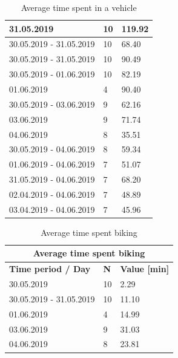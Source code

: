 \begin{table}[]
{\begin{tabular}{|l|l|l|}
			31.05.2019                 & 10         & 119.92                   \\ \hline
			30.05.2019 - 31.05.2019    & 10         & 68.40                    \\ \hline
			30.05.2019 - 31.05.2019    & 10         & 90.49                    \\ \hline
			30.05.2019 - 01.06.2019    & 10         & 82.19                    \\ \hline
			01.06.2019                 & 4          & 90.40                    \\ \hline
			30.05.2019 - 03.06.2019    & 9          & 62.16                    \\ \hline
			03.06.2019                 & 9          & 71.74                    \\ \hline
			04.06.2019                 & 8          & 35.51                    \\ \hline
			30.05.2019 - 04.06.2019    & 8          & 59.34                    \\ \hline
			01.06.2019 - 04.06.2019    & 7          & 51.07                    \\ \hline
			31.05.2019 - 04.06.2019    & 7          & 68.20                    \\ \hline
			02.04.2019 - 04.06.2019    & 7          & 48.89                    \\ \hline
			03.04.2019 - 04.06.2019    & 7          & 45.96                    \\ \hline
		\end{tabular}
		\caption{Average time spent in a vehicle}
		\label{results-vehicle}
	}
\end{table}

\begin{table}[]
	\centering
	\begin{tabular}{|l|l|l|}
		\hline
		\multicolumn{3}{|c|}{\textbf{Average time spent biking}}           \\ \hline
		\textbf{Time period / Day} & \textbf{N} & \textbf{Value {[}min{]}} \\ \hline
		30.05.2019                 & 10         & 2.29                     \\ \hline
		30.05.2019 - 31.05.2019    & 10         & 11.10                    \\ \hline
		01.06.2019                 & 4          & 14.99                    \\ \hline
		03.06.2019                 & 9          & 31.03                    \\ \hline
		04.06.2019                 & 8          & 23.81                    \\ \hline
	\end{tabular}
	\caption{Average time spent biking}
	\label{results-biking}
\end{table}

